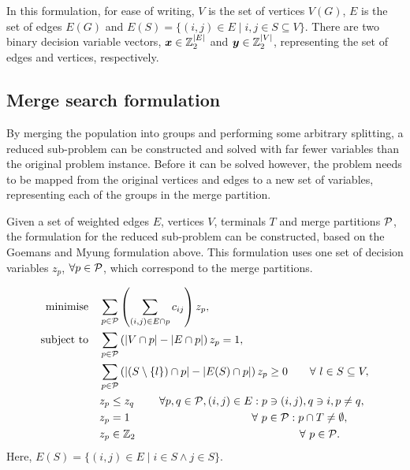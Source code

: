 \documentclass[journal]{IEEEtran}
\begin{document}
In this formulation, for ease of writing, \(V\) is the set of vertices \(V(G)\), \(E\) is the set of edges \(E(G)\) and \(E(S) = \{(i,j) \in E \mid i,j \in S \subseteq V\}\). There are two binary decision variable vectors, \(\V{x} \in \Bin^{|E|}\) and \(\V{y} \in \Bin^{|V|}\), representing the set of edges and vertices, respectively.

\subsection*{Merge search formulation}
By merging the population into groups and performing some arbitrary splitting, a reduced sub-problem can be constructed and solved with far fewer variables than the original problem instance. Before it can be solved however, the problem needs to be mapped from the original vertices and edges to a new set of variables, representing each of the groups in the merge partition.

Given a set of weighted edges \(E\), vertices \(V\), terminals \(T\) and merge partitions \(\S{P}\), the formulation for the reduced sub-problem can be constructed, based on the Goemans and Myung formulation above. This formulation uses one set of decision variables \(z_p\), \(\forall p \in \S{P}\), which correspond to the merge partitions.


{\footnotesize
\begin{align}
\Min \quad & \displaystyle\sum_{p \in \S{P}}\left(\displaystyle\sum_{(i,j) \in E \cap p} c_{ij}\right)z_{p},\label{eq:stpg_merge}\\
\ST \quad & \displaystyle\sum_{p \in \S{P}}\left(|V\cap p| - |E\cap p|\right)z_{p} = 1,\nonumber\\
& \displaystyle\sum_{p \in \S{P}}\left(|(S\setminus\{l\}) \cap p| - |E(S)\cap p|\right)z_{p} \geq 0 \qquad \forall\ l \in S \subseteq V,\nonumber\\
& z_p \leq z_q \hspace{0.8cm} \forall  p,q\in \S{P},(i,j) \in E : p \ni (i,j),q \ni i,p \neq q, \nonumber\\
& z_p = 1 \hspace{3.9cm}  \forall\ p \in \S{P} :  p \cap T \neq \emptyset,\nonumber\\
& z_p \in \Bin \hspace{5.25cm} \forall\ p \in \S{P}\nonumber.
\end{align}
}
%
Here, \(E(S) = \{(i,j) \in E \mid i \in S \land j \in S\}.\)
\end{document}
